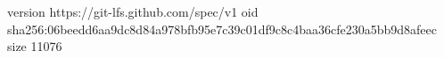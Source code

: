 version https://git-lfs.github.com/spec/v1
oid sha256:06beedd6aa9dc8d84a978bfb95e7c39c01df9c8c4baa36cfe230a5bb9d8afeec
size 11076

